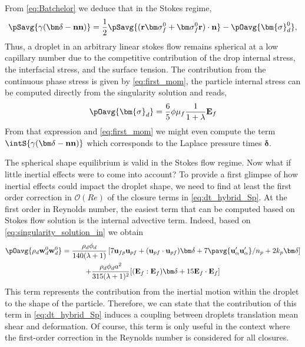 
From  \ref{eq:Batchelor} we deduce that in the Stokes regime, 
\begin{equation*}
    \pSavg{\gamma(\bm\delta - \textbf{nn})}
    = 
    \frac{1}{2}\pSavg{(\textbf{r}\bm\sigma_f^0+\bm\sigma_f^0\textbf{r})\cdot \textbf{n}}
    - \pOavg{\bm{\sigma}_d^0},
\end{equation*}
Thus, a droplet in an arbitrary linear stokes flow remains spherical at a low capillary number due to the competitive contribution of the drop internal stress, the interfacial stress, and the surface tension.
The contribution from the continuous phase stress is given by \ref{eq:first_mom}, the particle internal stress can be computed directly from the singularity solution and reads, 
\begin{equation}
    \pOavg{\bm{\sigma}_d}
    = \frac{6}{5}\phi \mu_f \frac{1}{1+\lambda} \textbf{E}_f
\end{equation}
From that expression and  \ref{eq:first_mom} we might even compute the term $ \intS{\gamma(\bm\delta - \textbf{nn})}$ which corresponds to the Laplace pressure times $\bm\delta$. 

The spherical shape equilibrium is valid in the Stokes flow regime. 
Now what if little inertial effects were to come into account?
To provide a first glimpse of how inertial effects could impact the droplet shape, we need to find at least the first order correction in $\mathcal{O}(Re)$ of the closure terms in \ref{eq:dt_hybrid_Sp}. 
At the first order in Reynolds number, the easiest term that can be computed based on Stokes flow solution is the internal advective term. 
Indeed, based on \ref{eq:singularity_solution_in} we obtain
\begin{multline}
    \pOavg{\rho_d \textbf{w}_d^0  \textbf{w}_d^0 }
    = \frac{\rho_d \phi_d}{140(\lambda +1 )}
    \left[
        7\textbf{u}_{fp}\textbf{u}_{pf} 
    + (\textbf{u}_{pf}\cdot \textbf{u}_{pf})\bm\delta
    + 7\pavg{\textbf{u}_\alpha'\textbf{u}_\alpha'}/n_p 
    + 2k_p \bm\delta
    \right]\\
    + \frac{\rho_d \phi_d a^2}{315 (\lambda + 1)^2}[(\textbf{E}_f : \textbf{E}_f)\bm\delta+15\textbf{E}_f\cdot \textbf{E}_f]
    \label{eq:ww_closure}
\end{multline}
This term represents the contribution from the inertial motion within the droplet to the shape of the particle. 
Therefore, we can state that the contribution of this term in \ref{eq:dt_hybrid_Sp} induces a coupling between droplets translation mean shear and deformation. 
Of course, this term is only useful in the context where the first-order correction in the Reynolds number is considered for all closures. 

